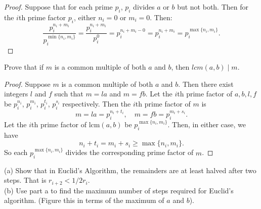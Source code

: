 \begin{proof}
    Suppose that for each prime $p_i$, $p_i$ divides $a$ or $b$ but not both.  
    Then for the $i$th prime factor $p_i$, either $n_i = 0$ or $m_i = 0$. 
    Then:
    \[
        \frac{p_i^{n_i + m_i}}{p_i^{\min\{n_i, m_i\}}} 
        = \frac{p_i^{n_i + m_i}}{p_i^0}
        = p_i^{n_i + m_i - 0}
        = p_i^{n_i + m_i}
        = p_i^{\max\{n_i, m_i\}}.
    \]
\end{proof}

\begin{tcolorbox}[title=Problem 13, breakable]
    Prove that if $m$ is a common multiple of both $a$ and $b$, then 
    $lcm(a, b) \mid m$.
\end{tcolorbox}

\begin{proof}
Suppose $m$ is a common multiple of both $a$ and $b$.
Then there exist integers $l$ and $f$ such that $m = la$ and $m = fb$.
Let the $i$th prime factor of $a, b, l, f$ be 
    $p_i^{n_i}$, $p_i^{m_i}$, $p_i^{t_i}$, $p_i^{s_i}$ respectively.
Then the $i$th prime factor of $m$ is
\[
m = la = p_i^{n_i+t_i}, \quad
m = fb = p_i^{m_i+s_i}.
\]
Let the $i$th prime factor of $\mathrm{lcm}(a,b)$ be $p_i^{\max\{n_i,m_i\}}$.
Then, in either case, we have
\[
n_i+t_i = m_i+s_i \ge \max\{n_i,m_i\}.
\]
So each $p_i^{\max\{n_i,m_i\}}$ divides the corresponding prime factor of $m$.
\end{proof}

\begin{tcolorbox}[title=Problem 18, breakable]
    (a) Show that in Euclid's Algorithm, the remainders are at least halved
    after two steps. That is $r_{i + 2} < 1/2 r_i$. \\

    (b) Use part a to find the maximum number of steps required for Euclid's
    algorithm. (Figure this in terms of the maximum of $a$ and $b$).
\end{tcolorbox}

